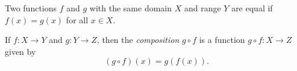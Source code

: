 \begin{definition} \label{def:fn:equality}
    Two functions $f$ and $g$ with the same domain $X$ and range $Y$ are
    equal if $f(x) = g(x)$ for all $x \in X$.
\end{definition}

\begin{definition}[Composition] \label{def:fn:composition}
    If $f : X \to Y$ and $g : Y \to Z$, then the \emph{composition} $g \circ f$
    is a function $g \circ f \colon X \to Z$ given by \[
        (g \circ f)(x) = g(f(x)).
    \]
\end{definition}
